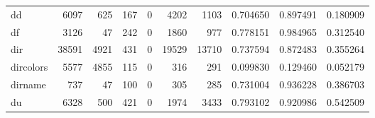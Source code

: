 \begin{longtable}{lrrrrrrrrr}
dd        &                                               6097 &                                                625 &                                                167 &                                                  0 &                                               4202 &                                               1103 &                                           0.704650 &                               0.897491 &                             0.180909 \\
df        &                                               3126 &                                                 47 &                                                242 &                                                  0 &                                               1860 &                                                977 &                                           0.778151 &                               0.984965 &                             0.312540 \\
dir       &                                              38591 &                                               4921 &                                                431 &                                                  0 &                                              19529 &                                              13710 &                                           0.737594 &                               0.872483 &                             0.355264 \\
dircolors &                                               5577 &                                               4855 &                                                115 &                                                  0 &                                                316 &                                                291 &                                           0.099830 &                               0.129460 &                             0.052179 \\
dirname   &                                                737 &                                                 47 &                                                100 &                                                  0 &                                                305 &                                                285 &                                           0.731004 &                               0.936228 &                             0.386703 \\
du        &                                               6328 &                                                500 &                                                421 &                                                  0 &                                               1974 &                                               3433 &                                           0.793102 &                               0.920986 &                             0.542509 \\

\end{longtable}
